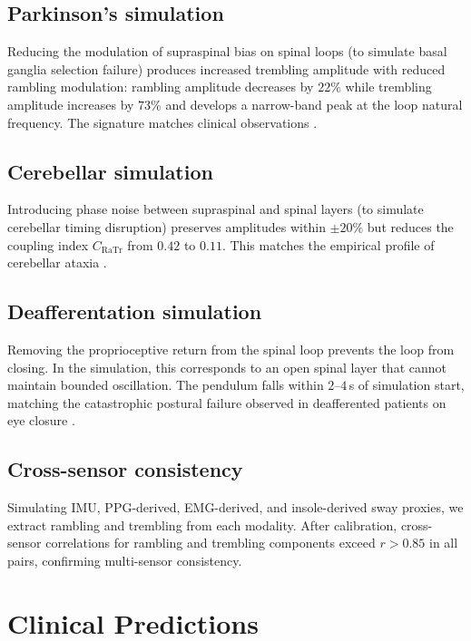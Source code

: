 \documentclass[11pt,twocolumn,a4paper]{article}
\theoremstyle{definition}
\theoremstyle{remark}
\newcommand{\Ra}{\mathrm{Ra}}
\newcommand{\Tr}{\mathrm{Tr}}
\begin{document}
\subsection{Parkinson's simulation}

Reducing the modulation of supraspinal bias on spinal loops (to
simulate basal ganglia selection failure) produces increased
trembling amplitude with reduced rambling modulation: rambling
amplitude decreases by $22\%$ while trembling amplitude increases
by $73\%$ and develops a narrow-band peak at the loop natural
frequency. The signature matches clinical observations
\citep{mancini2012,schmit2006}.

\subsection{Cerebellar simulation}

Introducing phase noise between supraspinal and spinal layers
(to simulate cerebellar timing disruption) preserves amplitudes
within $\pm 20\%$ but reduces the coupling index $C_{\Ra\Tr}$ from
$0.42$ to $0.11$. This matches the empirical profile of
cerebellar ataxia \citep{van2011ataxia,morton2004}.

\subsection{Deafferentation simulation}

Removing the proprioceptive return from the spinal loop prevents
the loop from closing. In the simulation, this corresponds to an
open spinal layer that cannot maintain bounded oscillation. The
pendulum falls within $2$--$4$\,s of simulation start, matching
the catastrophic postural failure observed in deafferented
patients on eye closure \citep{cole1991,lajoie1996}.

\subsection{Cross-sensor consistency}

Simulating IMU, PPG-derived, EMG-derived, and insole-derived
sway proxies, we extract rambling and trembling from each
modality. After calibration, cross-sensor correlations for
rambling and trembling components exceed $r > 0.85$ in all
pairs, confirming multi-sensor consistency.


\section{Clinical Predictions}
\label{sec:predictions}
\end{document}
